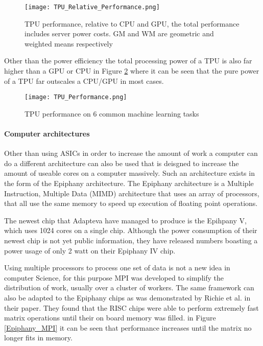 \begin{figure}
  \texttt{[image: TPU\_Relative\_Performance.png]}
  \caption{TPU performance, relative to CPU and GPU, the total performance includes server power costs. GM and WM are geometric and weighted means respectively \cite{Joup17}}
  \label{TPU_Relative_Performance}
\end{figure}

Other than the power efficiency the total processing power of a TPU is also far higher
than a GPU or CPU in Figure \ref{TPU_Performance} where it can be seen that the pure
power of a TPU far outscales a CPU/GPU in most cases.

\begin{figure}
  \texttt{[image: TPU\_Performance.png]}
  \caption{TPU performance on 6 common machine learning tasks\cite{Sato17}}
  \label{TPU_Performance}
\end{figure}


\paragraph{Computer architectures}
Other than using ASICs in order to increase the amount of work a computer can do
a different architecture can also be used that is deisgned to increase the amount
of useable cores on a computer massively. Such an architecture exists in the form
of the Epiphany architecture. The Epiphany architecture is a Multiple Instruction,
Multiple Data (MIMD) architecture that uses an array of processors, that all use the
same memory to speed up execution of floating point operations\cite{Olof16}.

The newest chip that Adapteva have managed to produce is the Epihpany V, which uses
1024 cores on a single chip\cite{Olof16}. Although the power consumption of their newest chip
is not yet public information, they have released numbers boasting a power usage of
only 2 watt on their Epiphany IV chip\cite{Adap}.

Using multiple processors to process one set of data is not a new idea in computer
Science, for this purpose MPI was developed to simplify the distribution of work,
usually over a cluster of workers. The same framework can also be adapted to the
Epiphany chips as was demonstrated by Richie et al. in their paper. They found that
the RISC chips were able to perform extremely fast matrix operations until their on board
memory was filled\cite{Rich15}. in Figure \ref{Epiphany_MPI} it can be seen that performance increases
until the matrix no longer fits in memory.

